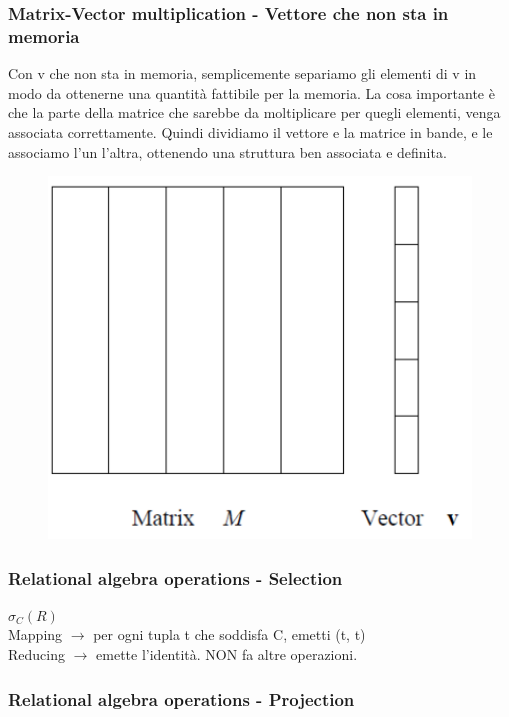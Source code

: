 \newpage

\subsubsection{Matrix-Vector multiplication - Vettore che non sta in memoria}
Con v che non sta in memoria, semplicemente separiamo gli elementi di v in modo da ottenerne una quantità fattibile per la memoria. La cosa importante è che la parte della matrice che sarebbe da moltiplicare per quegli elementi, venga associata correttamente. Quindi dividiamo il vettore e la matrice in bande, e le associamo l'un l'altra, ottenendo una struttura ben associata e definita. 
\\
\begin{figure}[th]
    \centering
    \includegraphics[scale=0.5]{MapReduce/img/MatrixSep.png}
    \label{fig:matrixmult}
\end{figure}

\subsubsection{Relational algebra operations - Selection}

$\sigma_C(R)$ 
\\
Mapping $\rightarrow$ per ogni tupla t che soddisfa C, emetti (t, t)
\\
Reducing $\rightarrow$ emette l'identità. NON fa altre operazioni.

\subsubsection{Relational algebra operations - Projection}

